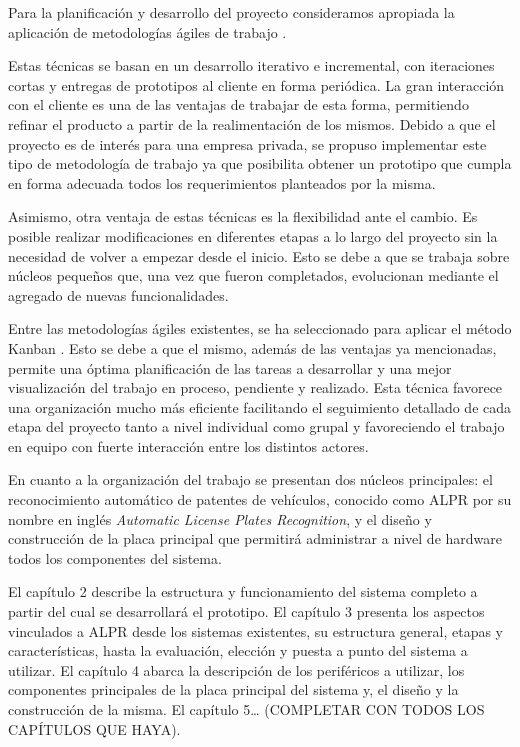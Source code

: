 Para la planificación y desarrollo del proyecto consideramos apropiada la aplicación de metodologías ágiles de trabajo \cite{Bahit}.  

Estas técnicas se basan en un desarrollo iterativo e incremental, con iteraciones cortas y entregas de prototipos al cliente en forma periódica. La gran interacción con el cliente es una de las ventajas de trabajar de esta forma, permitiendo refinar el producto a partir de la realimentación de los mismos. Debido a que el proyecto es de interés para una empresa privada, se propuso implementar este tipo de metodología de trabajo ya que posibilita obtener un prototipo que cumpla en forma adecuada todos los requerimientos planteados por la misma.

Asimismo, otra ventaja de estas técnicas es la flexibilidad ante el cambio. Es posible realizar modificaciones en diferentes etapas a lo largo del proyecto sin la necesidad de volver a empezar desde el inicio. Esto se debe a que se trabaja sobre núcleos pequeños que, una vez que fueron completados, evolucionan mediante el agregado de nuevas funcionalidades.

Entre las metodologías ágiles existentes, se ha seleccionado para aplicar el método Kanban \cite{Bahit} \cite{ApunteWingu}. Esto se debe a que el mismo, además de las ventajas ya mencionadas, permite una óptima planificación de las tareas a desarrollar y una mejor visualización del trabajo en proceso, pendiente y realizado. Esta técnica favorece una organización mucho más eficiente facilitando el seguimiento detallado de cada etapa del proyecto tanto a nivel individual como grupal y favoreciendo el trabajo en equipo con fuerte interacción entre los distintos actores.

En cuanto a la organización del trabajo se presentan dos núcleos principales: el reconocimiento automático de patentes de vehículos, conocido como ALPR por su nombre en inglés \textit{Automatic License Plates Recognition}, y el diseño y construcción de la placa principal que permitirá administrar a nivel de hardware todos los componentes del sistema.

El capítulo 2 describe la estructura y funcionamiento del sistema completo a partir del cual se desarrollará el prototipo. El capítulo 3 presenta los aspectos vinculados a ALPR desde los sistemas existentes, su estructura general, etapas y características, hasta la evaluación, elección y puesta a punto del sistema a utilizar. El capítulo 4 abarca la descripción de los periféricos a utilizar, los componentes principales de la placa principal del sistema y, el diseño y la construcción de la misma. El capítulo 5…  \textcolor{mPurple}{(COMPLETAR CON TODOS LOS CAPÍTULOS QUE HAYA)}.








